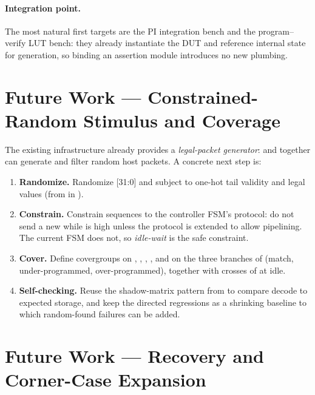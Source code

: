 \paragraph{Integration point.}
The most natural first targets are the PI integration bench and the
program--verify LUT bench: they already instantiate the DUT and
reference internal state for  generation, so binding
an assertion module introduces no new plumbing.

\section{Future Work --- Constrained-Random Stimulus and Coverage}
\label{sec:future-cr}

The existing infrastructure already provides a \emph{legal-packet
generator}:  and
 together can generate and filter
random host packets. A concrete next step is:

\begin{enumerate}
    \item \textbf{Randomize.} Randomize [31:0] and
           subject to one-hot tail validity and legal
           values (from  in
          ).
    \item \textbf{Constrain.} Constrain sequences to the controller
          FSM's protocol: do not send a new  while
           is high unless the protocol is extended to
          allow pipelining. The current FSM does not, so \emph{idle-wait}
          is the safe constraint.
    \item \textbf{Cover.} Define covergroups on ,
          , ,
          , and on the three branches of
           (match, under-programmed, over-programmed),
          together with crosses of  at idle.
    \item \textbf{Self-checking.} Reuse the shadow-matrix pattern from
           to compare
           decode to expected storage, and
          keep the directed regressions as a shrinking baseline to
          which random-found failures can be added.
\end{enumerate}

\section{Future Work --- Recovery and Corner-Case Expansion}
\label{sec:future-recovery}


